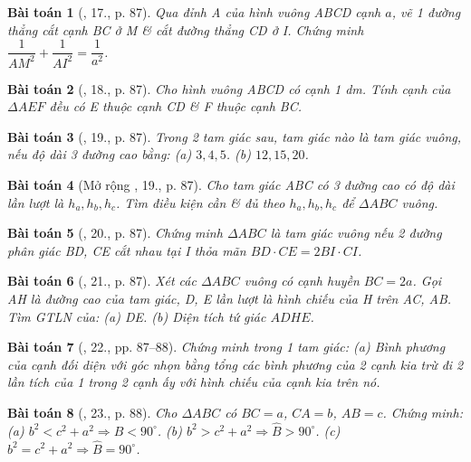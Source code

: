 \documentclass{article}
\newtheorem{baitoan}{Bài toán}
\begin{document}
\begin{baitoan}[\cite{Binh_Toan_9_tap_1}, 17., p. 87]
	Qua đỉnh A của hình vuông ABCD cạnh $a$, vẽ 1 đường thẳng cắt cạnh BC ở M \& cắt đường thẳng CD ở I. Chứng minh $\dfrac{1}{AM^2} + \dfrac{1}{AI^2} = \dfrac{1}{a^2}$.
\end{baitoan}

\begin{baitoan}[\cite{Binh_Toan_9_tap_1}, 18., p. 87]
	Cho hình vuông ABCD có cạnh {\rm1 dm}. Tính cạnh của $\Delta AEF$ đều có E thuộc cạnh CD \& F thuộc cạnh BC.
\end{baitoan}

\begin{baitoan}[\cite{Binh_Toan_9_tap_1}, 19., p. 87]
	Trong 2 tam giác sau, tam giác nào là tam giác vuông, nếu độ dài 3 đường cao bằng: (a) $3,4,5$. (b) $12,15,20$.
\end{baitoan}


\begin{baitoan}[Mở rộng \cite{Binh_Toan_9_tap_1}, 19., p. 87]
	Cho tam giác ABC có 3 đường cao có độ dài lần lượt là $h_a,h_b,h_c$. Tìm điều kiện cần \& đủ theo $h_a,h_b,h_c$ để $\Delta ABC$ vuông.
\end{baitoan}

\begin{baitoan}[\cite{Binh_Toan_9_tap_1}, 20., p. 87]
	Chứng minh $\Delta ABC$ là tam giác vuông nếu 2 đường phân giác BD, CE cắt nhau tại I thỏa mãn $BD\cdot CE = 2BI\cdot CI$.
\end{baitoan}

\begin{baitoan}[\cite{Binh_Toan_9_tap_1}, 21., p. 87]
	Xét các $\Delta ABC$ vuông có cạnh huyền $BC = 2a$. Gọi AH là đường cao của tam giác, D, E lần lượt là hình chiếu của H trên AC, AB. Tìm {\rm GTLN} của: (a) DE. (b) Diện tích tứ giác $ADHE$.
\end{baitoan}

\begin{baitoan}[\cite{Binh_Toan_9_tap_1}, 22., pp. 87--88]
	Chứng minh trong 1 tam giác: (a) Bình phương của cạnh đối diện với góc nhọn bằng tổng các bình phương của 2 cạnh kia trừ đi 2 lần tích của 1 trong 2 cạnh ấy với hình chiếu của cạnh kia trên nó.
\end{baitoan}

\begin{baitoan}[\cite{Binh_Toan_9_tap_1}, 23., p. 88]
	Cho $\Delta ABC$ có $BC = a$, $CA = b$, $AB = c$. Chứng minh: (a) $b^2 < c^2 + a^2\Rightarrow\widehat{B} < 90^\circ$. (b) $b^2 > c^2 + a^2\Rightarrow\widehat{B} > 90^\circ$. (c) $b^2 = c^2 + a^2\Rightarrow\widehat{B} = 90^\circ$.
\end{baitoan}
\end{document}
